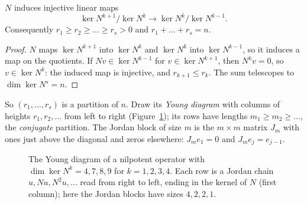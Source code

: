 \begin{lemma}\label{linear:lem:decreasing}
$N$ induces injective linear maps
\[
\ker N^{k+1}/\ker N^k\longrightarrow\ker N^k/\ker N^{k-1}.
\]
Consequently $r_1\ge r_2\ge\dots\ge r_s>0$
and $r_1+\dots+r_s=n$.
\end{lemma}
\begin{proof}
$N$ maps $\ker N^{k+1}$ into $\ker N^k$ and $\ker N^k$ into $\ker N^{k-1}$, so it induces a map on the quotients. If $Nv\in\ker
N^{k-1}$ for $v\in\ker N^{k+1}$, then $N^kv=0$, so $v\in\ker N^k$: the induced map is injective, and $r_{k+1}\le r_k$. The sum
telescopes to $\dim\ker N^s=n$.
\end{proof}

So $(r_1,\dots,r_s)$ is a partition of $n$. Draw its \emph{Young diagram} with columns of heights $r_1,r_2,\dots$ from left
to right (Figure~\ref{linear:fig:young}); its rows have lengths $m_1\ge m_2\ge\dots$, the \emph{conjugate} partition. The Jordan
block of size $m$ is the $m\times m$ matrix $J_m$ with ones just above the diagonal and zeros elsewhere: $J_me_1=0$ and
$J_me_j=e_{j-1}$.

\begin{figure}[ht]
\centering
{}
\caption{The Young diagram of a nilpotent operator with $\dim\ker N^k=4,7,8,9$ for $k=1,2,3,4$. Each row is a Jordan
chain $u,Nu,N^2u,\dots$ read from right to left, ending in the kernel of $N$ (first column); here the Jordan blocks have
sizes $4,2,2,1$.}
\label{linear:fig:young}
\end{figure}

